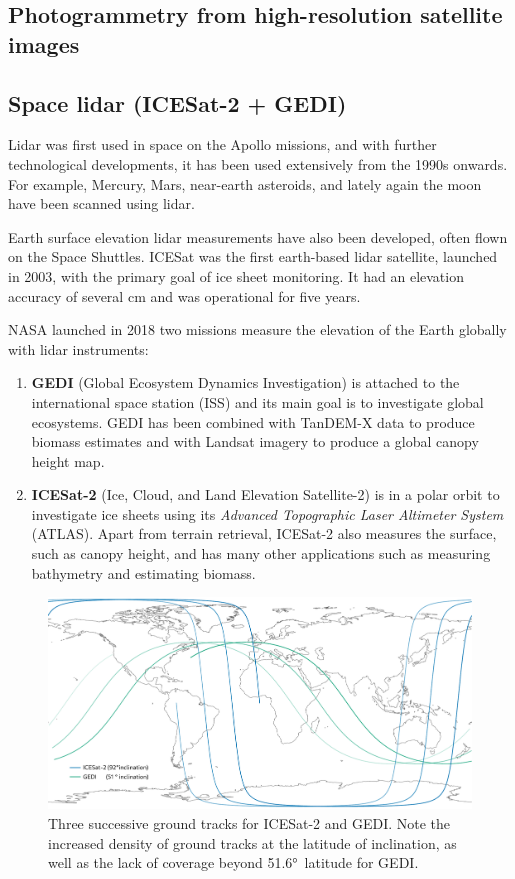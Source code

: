\subsection{Photogrammetry from high-resolution satellite images}


\subsection{Space lidar (ICESat-2 + GEDI)}

Lidar was first used in space on the Apollo missions, and with further technological developments, it has been used extensively from the 1990s onwards.
For example, Mercury, Mars, near-earth asteroids, and lately again the moon have been scanned using lidar.

Earth surface elevation lidar measurements have also been developed, often flown on the Space Shuttles.
ICESat was the first earth-based lidar satellite, launched in 2003, with the primary goal of ice sheet monitoring.
It had an elevation accuracy of several cm and was operational for five years.

NASA launched in 2018 two missions measure the elevation of the Earth globally with lidar instruments:
\begin{enumerate}
  \item \textbf{GEDI} (Global Ecosystem Dynamics Investigation) is attached to the international space station (ISS) and its main goal is to investigate global ecosystems.
  GEDI has been combined with TanDEM-X data to produce biomass estimates and with Landsat imagery to produce a global canopy height map.
  \item \textbf{ICESat-2} (Ice, Cloud, and Land Elevation Satellite-2) is in a polar orbit to investigate ice sheets using its \emph{Advanced Topographic Laser Altimeter System} (ATLAS). 
  Apart from terrain retrieval, ICESat-2 also measures the surface, such as canopy height, and has many other applications such as measuring bathymetry and estimating biomass.
\end{enumerate}
\begin{figure}
  \centering
  \includegraphics[width=\linewidth]{orbit}
  \caption{Three successive ground tracks for ICESat-2 and GEDI\@. Note the increased density of ground tracks at the latitude of inclination, as well as the lack of coverage beyond \ang{51.6}~latitude for GEDI.}%
\end{figure}



